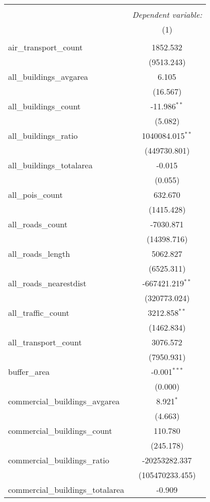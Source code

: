 \begin{table}[!htbp] \centering
\begin{tabular}{@{\extracolsep{5pt}}lc}
\\[-1.8ex]\hline
\hline \\[-1.8ex]
& \multicolumn{1}{c}{\textit{Dependent variable:}} \
\cr \cline{1-2}
\\[-1.8ex] & (1) \\
\hline \\[-1.8ex]
 air_transport_count & 1852.532$^{}$ \\
  & (9513.243) \\
 all_buildings_avgarea & 6.105$^{}$ \\
  & (16.567) \\
 all_buildings_count & -11.986$^{**}$ \\
  & (5.082) \\
 all_buildings_ratio & 1040084.015$^{**}$ \\
  & (449730.801) \\
 all_buildings_totalarea & -0.015$^{}$ \\
  & (0.055) \\
 all_pois_count & 632.670$^{}$ \\
  & (1415.428) \\
 all_roads_count & -7030.871$^{}$ \\
  & (14398.716) \\
 all_roads_length & 5062.827$^{}$ \\
  & (6525.311) \\
 all_roads_nearestdist & -667421.219$^{**}$ \\
  & (320773.024) \\
 all_traffic_count & 3212.858$^{**}$ \\
  & (1462.834) \\
 all_transport_count & 3076.572$^{}$ \\
  & (7950.931) \\
 buffer_area & -0.001$^{***}$ \\
  & (0.000) \\
 commercial_buildings_avgarea & 8.921$^{*}$ \\
  & (4.663) \\
 commercial_buildings_count & 110.780$^{}$ \\
  & (245.178) \\
 commercial_buildings_ratio & -20253282.337$^{}$ \\
  & (105470233.455) \\
 commercial_buildings_totalarea & -0.909$^{}$ \\

\end{tabular}
\end{table}
